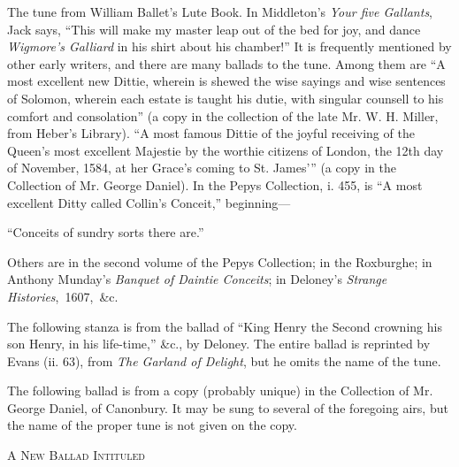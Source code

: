 
\pagebreak


The tune from William Ballet’s Lute Book. In Middleton’s \textit{Your five Gallants},
Jack says, “This will make my master leap out of the bed for joy, and dance
\textit{Wigmore’s Galliard} in his shirt about his chamber!” It is frequently mentioned
by other early writers, and there are many ballads to the tune. Among them
are “A most excellent new Dittie, wherein is shewed the wise sayings and wise
sentences of Solomon, wherein each estate is taught his dutie, with singular
counsell to his comfort and consolation” (a copy in the collection of the late
Mr. W. H. Miller, from Heber’s Library). “A most famous Dittie of the joyful
receiving of the Queen’s most excellent Majestie by the worthie citizens of
London, the 12th day of November, 1584, at her Grace’s coming to St. James’”
(a copy in the Collection of Mr. George Daniel). In the Pepys Collection, i. 455,
is “A most excellent Ditty called Collin’s Conceit,” beginning—
\settowidth{\versewidth}{“Conceits of sundry sorts there are.”}
\begin{scverse}
“Conceits of sundry sorts there are.”
\end{scverse}
Others are in the second volume of the Pepys Collection; in the Roxburghe; in
Anthony Munday’s \textit{Banquet of Daintie Conceits}; in Deloney’s \textit{Strange Histories},~1607,~\&c.

The following stanza is from the ballad of “King Henry the Second crowning
his son Henry, in his life-time,” \&c., by Deloney. The entire ballad is reprinted
by Evans (ii. 63), from \textit{The Garland of Delight}, but he omits the name of the tune.


\pagebreak


The following ballad is from a copy (probably unique) in the Collection of
Mr. George Daniel, of Canonbury. It may be sung to several of the foregoing
airs, but the name of the proper tune is not given on the copy.

\begin{center}\small\textsc{A New Ballad Intituled}
\end{center}


